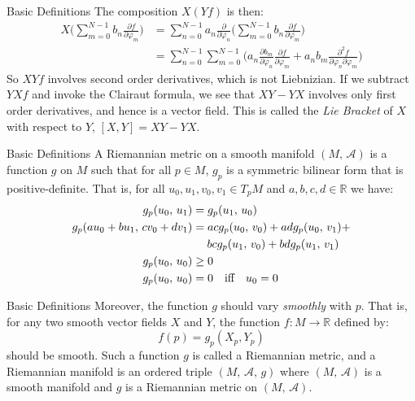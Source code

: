 \documentclass{beamer}
\begin{document}
    \begin{frame}{Basic Definitions}
        The composition $X(Yf)$ is then:
        \begin{align}
            X\Big(
                \sum_{m=0}^{N-1}b_{n}\frac{\partial{f}}{\partial\varphi_{m}}
            \Big)
            &=\sum_{n=0}^{N-1}a_{n}\frac{\partial}{\partial\varphi_{n}}
            \Big(
                \sum_{m=0}^{N-1}b_{n}\frac{\partial{f}}{\partial\varphi_{m}}
            \Big)\\
            &=\sum_{n=0}^{N-1}\sum_{m=0}^{N-1}\Big(
                a_{n}\frac{\partial{b}_{m}}{\partial\varphi_{n}}
                \frac{\partial{f}}{\partial\varphi_{m}}+
                a_{n}b_{m}
                \frac{\partial^{2}{f}}{\partial\varphi_{n}\partial\varphi_{m}}
            \Big)
        \end{align}
        So $XYf$ involves second order derivatives, which is not Liebnizian.
        If we subtract $YXf$ and invoke the Clairaut formula, we see that
        $XY-YX$ involves only first order derivatives, and hence is a
        vector field. This is called the \textit{Lie Bracket} of $X$ with
        respect to $Y$, $[X,Y]=XY-YX$.
    \end{frame}
    \begin{frame}{Basic Definitions}
        A Riemannian metric on a smooth manifold $(M,\,\mathcal{A})$ is a
        function $g$ on $M$ such that for all $p\in{M}$,
        $g_{p}$ is a symmetric bilinear form that is positive-definite. That
        is, for all $u_{0},u_{1},v_{0},v_{1}\in{T}_{p}M$ and
        $a,b,c,d\in\mathbb{R}$ we have:
        \begin{align}
            g_{p}(u_{0},\,u_{1})
            &=g_{p}(u_{1},\,u_{0})\\
                g_{p}(au_{0}+bu_{1},\,cv_{0}+dv_{1})
            &=acg_{p}(u_{0},\,v_{0})+adg_{p}(u_{0},\,v_{1})+\nonumber\\
            &\hspace{1.3em}bcg_{p}(u_{1},\,v_{0})+bdg_{p}(u_{1},\,v_{1})\\
            g_{p}(u_{0},\,u_{0})&\geq{0}\\
            g_{p}(u_{0},\,u_{0})
            &=0\quad\textrm{iff}\quad{u}_{0}=0
        \end{align}
    \end{frame}
    \begin{frame}{Basic Definitions}
        Moreover, the function $g$ should vary \textit{smoothly} with $p$.
        That is, for any two smooth vector fields $X$ and $Y$, the function
        $f:M\rightarrow\mathbb{R}$ defined by:
        \begin{equation}
            f(p)=g_{p}(X_{p},Y_{p})
        \end{equation}
        should be smooth. Such a function $g$ is called a Riemannian metric,
        and a Riemannian manifold is an ordered triple
        $(M,\,\mathcal{A},\,g)$ where $(M,\,\mathcal{A})$ is a smooth manifold
        and $g$ is a Riemannian metric on $(M,\,\mathcal{A})$.
    \end{frame}
\end{document}
